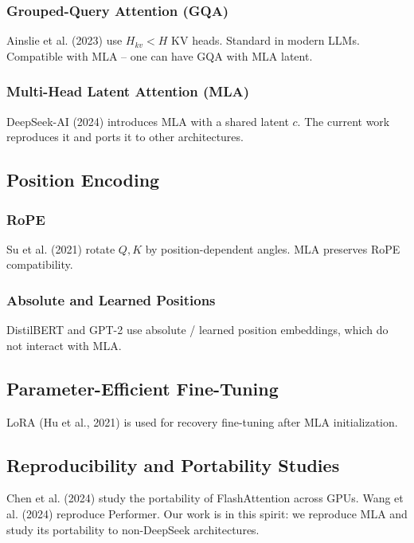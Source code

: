 \subsubsection{Grouped-Query Attention (GQA)}

Ainslie et al. (2023) use $H_{kv} < H$ KV heads. Standard in modern 
LLMs. Compatible with MLA -- one can have GQA with MLA latent.

\subsubsection{Multi-Head Latent Attention (MLA)}

DeepSeek-AI (2024) introduces MLA with a shared latent $c$. The current 
work reproduces it and ports it to other architectures.

\subsection{Position Encoding}

\subsubsection{RoPE}

Su et al. (2021) rotate $Q, K$ by position-dependent angles. MLA preserves 
RoPE compatibility.

\subsubsection{Absolute and Learned Positions}

DistilBERT and GPT-2 use absolute / learned position embeddings, which do 
not interact with MLA.

\subsection{Parameter-Efficient Fine-Tuning}

LoRA (Hu et al., 2021) is used for recovery fine-tuning after MLA 
initialization.

\subsection{Reproducibility and Portability Studies}

Chen et al. (2024) study the portability of FlashAttention across GPUs. 
Wang et al. (2024) reproduce Performer. Our work is in this spirit: we 
reproduce MLA and study its portability to non-DeepSeek architectures.

